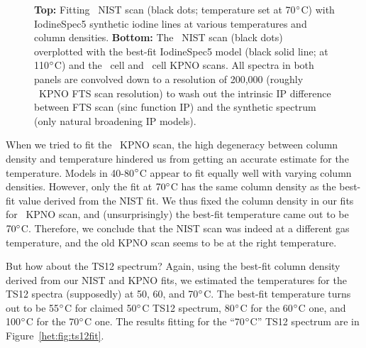 \begin{figure}
\caption{{\bf Top:} Fitting \het\ NIST scan (black dots; temperature
set at 70$^{\circ}$C) with IodineSpec5 synthetic iodine lines at
various temperatures and column densities. {\bf Bottom:} The \het\
NIST scan (black dots) overplotted with the best-fit IodineSpec5 model
(black solid line; at 110$^{\circ}$C) and the \het\ cell and \keck\ 
cell KPNO scans. All spectra in both panels are convolved down to a
resolution of 200,000 (roughly \keck\ KPNO FTS scan resolution) to
wash out the intrinsic IP difference between FTS scan (sinc function
IP) and the synthetic spectrum (only natural broadening IP models).
\label{het:fig:nistfit}}
\end{figure}

When we tried to fit the \het\ KPNO scan, the high degeneracy between
column density and temperature hindered us from getting an accurate
estimate for the temperature. Models in 40-80$^{\circ}$C appear to fit
equally well with varying column densities. However, only the fit at
$70^{\circ}$C has the same column density as the best-fit value derived
from the NIST fit. We thus fixed the column
density in our fits for \het\ KPNO scan, and (unsurprisingly) the best-fit
temperature came out to be $70^{\circ}$C. Therefore, we conclude that
the NIST scan was indeed at a different gas temperature, and the old
KPNO scan seems to be at the right temperature.

But how about the TS12 spectrum? Again, using the best-fit column
density derived from our NIST and KPNO fits, we estimated the
temperatures for the TS12 spectra (supposedly) at 50, 60, and
70$^{\circ}$C. The best-fit temperature turns out to be 55$^{\circ}$C
for claimed 50$^{\circ}$C TS12 spectrum, 80$^{\circ}$C for the
60$^{\circ}$C one, and 100$^{\circ}$C for the 70$^{\circ}$C one. The
results fitting for the ``70$^{\circ}$C'' TS12 spectrum are in
Figure~\ref{het:fig:ts12fit}.  


